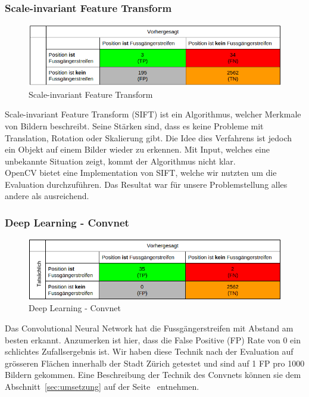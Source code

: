 \subsubsection{\Gls{Scale-invariant Feature Transform}}	
\begin{figure}[H]
\includegraphics[width=\textwidth]{images/sif_conf.png}
\caption[Scale-invariant Feature Transform]{Scale-invariant Feature Transform}
\end{figure}
Scale-invariant Feature Transform (SIFT) ist ein Algorithmus, welcher Merkmale von Bildern beschreibt. Seine Stärken sind, dass es keine Probleme mit Translation, Rotation oder Skalierung gibt. Die Idee dies Verfahrens ist jedoch ein Objekt auf einem Bilder wieder zu erkennen. Mit Input, welches eine unbekannte Situation zeigt, kommt der Algorithmus nicht klar.\\
OpenCV bietet eine Implementation von SIFT, welche wir nutzten um die Evaluation durchzuführen. Das Resultat war für unsere Problemstellung alles andere als ausreichend.
\subsubsection{Deep Learning - Convnet}	
\begin{figure}[H]
\includegraphics[width=\textwidth]{images/deep_conf.png}
\caption[Deep Learning]{\Gls{Deep Learning} - Convnet}
\end{figure}
Das \Gls{Convolutional Neural Network} hat die Fussgängerstreifen mit Abstand am besten erkannt. Anzumerken ist hier, dass die False Positive (FP) Rate von 0 ein schlichtes Zufallsergebnis ist. Wir haben diese Technik nach der Evaluation auf grösseren Flächen innerhalb der Stadt Zürich getestet und sind auf 1 FP pro 1000 Bildern gekommen. Eine Beschreibung der Technik des \Gls{Convnet}s können sie dem  Abschnitt~\ref{sec:umsetzung} auf der Seite~\pageref{sec:umsetzung} entnehmen.
\newpage

